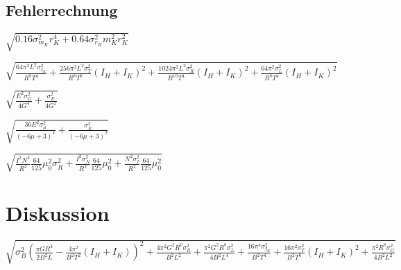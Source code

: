  \subsection{Fehlerrechnung}
  $\sqrt{0.16 \sigma_{m_{K}}^{2} r_{K}^{4} + 0.64 \sigma_{r_{K}}^{2} m_{K}^{2} r_{K}^{2}}$
  
  $\displaystyle \sqrt{\frac{64 \pi^{2} L^{2} \sigma_{I_{K}}^{2}}{R^{8} T^{4}} + \frac{256 \pi^{2} L^{2} \sigma_{T}^{2}}{R^{8} T^{6}} \left(I_{H} + I_{K}\right)^{2} +
  \frac{1024 \pi^{2} L^{2} \sigma_{R}^{2}}{R^{10} T^{4}} \left(I_{H} + I_{K}\right)^{2} + \frac{64 \pi^{2} \sigma_{L}^{2}}{R^{8} T^{4}} \left(I_{H} + I_{K}\right)^{2}}$
  
  $\displaystyle  \sqrt{\frac{E^{2} \sigma_{G}^{2}}{4 G^{4}} + \frac{\sigma_{E}^{2}}{4 G^{2}}}$
  
  $\displaystyle  \sqrt{\frac{36 E^{2} \sigma_{\mu}^{2}}{\left(- 6 \mu + 3\right)^{4}} + \frac{\sigma_{E}^{2}}{\left(- 6 \mu + 3\right)^{2}}}$
  
  $\displaystyle  \sqrt{\frac{I^{2} N^{2}}{R^{4}} \frac{64}{125}\mu_{0}^{2} \sigma_{R}^{2} + \frac{I^{2} \sigma_{N}^{2}}{R^{2}}\frac{64}{125}\mu_{0}^{2}+ \frac{N^{2} \sigma_{I}^{2}}{R^{2}} \frac{64}{125}\mu_{0}^{2}}$
  \section{Diskussion}
   
  $ \sqrt{\sigma_{B}^{2} \left(\frac{\pi G R^{4}}{2 B^{2} L} - \frac{ 4\pi^{2} }{B^{2} T^{2}} \left(I_{H} + I_{K}\right)\right)^{2} + \frac{4\pi^{2} G^{2} R^{6} \sigma_{R}^{2}}{B^{2} L^{2}} + \frac{\pi^{2} G^{2} R^{8} \sigma_{L}^{2}}{4 B^{2} L^{4}} + \frac{16\pi^{4} \sigma_{I_{K}}^{2}}{B^{2} T^{4}} + \frac{16 \pi^{2} \sigma_{T}^{2}}{B^{2} T^{6}} \left(I_{H} + I_{K}\right)^{2} + \frac{\pi^{2} R^{8} \sigma_{G}^{2}}{4 B^{2} L^{2}}}$



